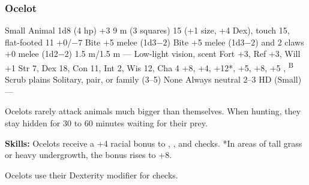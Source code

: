 \subsubsection{Ocelot}
\begin{MonsterStats}
{Small Animal}
{1d8 (4 hp)}
{+3}
{9 m (3 squares)}
{15 (+1 size, +4 Dex), touch 15, flat-footed 11}
{+0/$-7$}
{Bite +5 melee (1d3$-2$)}
{Bite +5 melee (1d3$-2$) and 2 claws +0 melee (1d2$-2$)}
{1.5 m/1.5 m}
{---}
{Low-light vision, scent}
{Fort +3, Ref +3, Will +1}
{Str 7, Dex 18, Con 11, Int 2, Wis 12, Cha 4}
{ +8,  +4,  +12*,  +5,  +8,  +5}
{, \textsuperscript{B}}
{Scrub plains}
{Solitary, pair, or family (3--5)}
{\onehalf}
{None}
{Always neutral}
{2--3 HD (Small)}
{---}
\end{MonsterStats}


Ocelots rarely attack animals much bigger than themselves. When hunting, they stay hidden for 30 to 60 minutes waiting for their prey.

\textbf{Skills:} Ocelots receive a +4 racial bonus to , , and  checks. *In areas of tall grass or heavy undergrowth, the  bonus rises to +8.

Ocelots use their Dexterity modifier for  checks.

